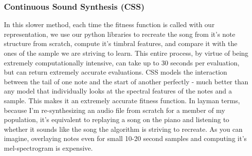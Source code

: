 \documentclass{pnastwo}
\begin{document}
\begin{article}
\subsubsection{Continuous Sound Synthesis (CSS)}
In this slower method, each time the fitness function is called with our representation, we use our python libraries to recreate the song from it's note structure from scratch, compute it's timbral features, and compare it with the ones of the sample we are striving to learn. This entire process, by virtue of being extremely computationally intensive, can take up to 30 seconds per evaluation, but can return extremely accurate evaluations. CSS models the interaction between the tail of one note and the start of another perfectly - much better than any model that individually looks at the spectral features of the notes and a sample. This makes it an extremely accurate fitness function. In layman terms, because I'm re-synthesizing an audio file from scratch for a member of my population, it's equivalent to replaying a song on the piano and listening to whether it sounds like the song the algorithm is striving to recreate. As you can imagine, overlaying notes even for small 10-20 second samples and computing it's mel-spectrogram is expensive.  


\end{article}
\end{document}
